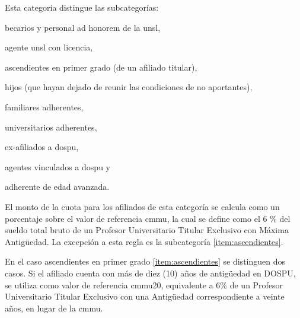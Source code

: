 Esta categoría distingue las subcategorías:
\begin{enumerate*}[label=(\alph*)]
    \item becarios y personal ad honorem de la \acrshort{unsl}, 
    \item agente \acrshort{unsl} con licencia, 
    \item 
    \label{item:ascendientes}
    ascendientes en primer grado (de un afiliado titular), 
    \item hijos (que hayan dejado de reunir las condiciones de no aportantes), 
    \item familiares adherentes, 
    \item universitarios adherentes, 
    \item ex-afiliados a \acrshort{dospu}, 
    \item agentes vinculados a \acrshort{dospu} y 
    \item 
    \label{item:avanzada}
    adherente de edad avanzada.
\end{enumerate*} 

El monto de la cuota para los afiliados de esta categoría se calcula como un porcentaje sobre el valor de referencia \acrfull{cmmu}, la cual se define como el 6 \% del sueldo total bruto de un Profesor Universitario Titular Exclusivo con Máxima Antigüedad. 
La excepción a esta regla es la subcategoría \ref{item:ascendientes}.

En el caso ascendientes en primer grado \ref{item:ascendientes} se distinguen dos casos.
Si el afiliado cuenta con más de diez (10) años de antigüedad en DOSPU, se utiliza como valor de referencia \acrshort{cmmu}20, equivalente a 6\% de un Profesor Universitario Titular Exclusivo con una Antigüedad correspondiente a veinte años, en lugar de la \acrshort{cmmu}\cite{dospuRes60}.
